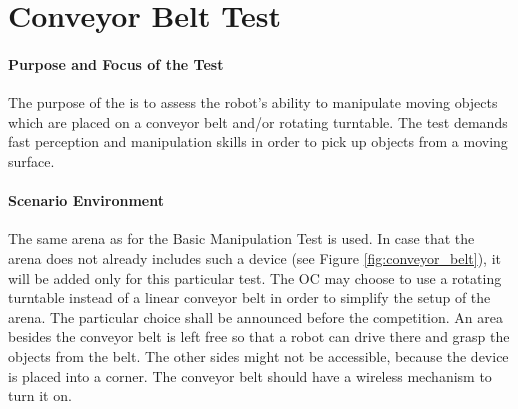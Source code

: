 \newpage
\section{Conveyor Belt Test}

\paragraph{Purpose and Focus of the Test}
The purpose of the  is to assess the robot's ability to manipulate moving objects which are placed on a conveyor belt and/or rotating turntable. The test demands fast perception and manipulation skills in order to pick up objects from a moving surface.

\paragraph{Scenario Environment}
The same arena as for the Basic Manipulation Test is used. In case that the arena does not already includes such a device (see Figure \ref{fig:conveyor_belt}), it will be added only for this particular test.
The OC may choose to use a rotating turntable instead of a linear conveyor belt in order to simplify the setup of the arena. The particular choice shall be announced before the competition.
An area besides the conveyor belt is left free so that a robot can drive there and grasp the objects from the belt. The other sides might not be accessible, because the device is placed into a corner. 
The conveyor belt should have a wireless mechanism to turn it on. 

